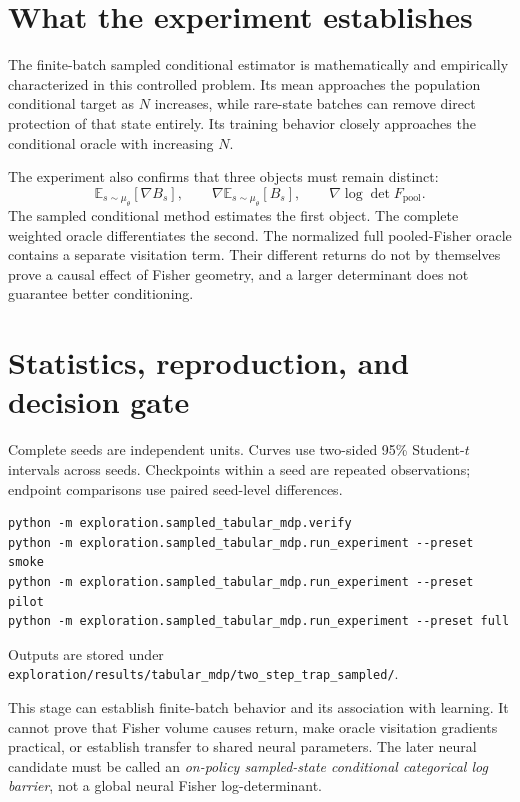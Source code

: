 \documentclass[10pt,a4paper]{article}
\begin{document}
\section{What the experiment establishes}
The finite-batch sampled conditional estimator is mathematically and
empirically characterized in this controlled problem. Its mean approaches the
population conditional target as $N$ increases, while rare-state batches can
remove direct protection of that state entirely. Its training behavior closely
approaches the conditional oracle with increasing $N$.

The experiment also confirms that three objects must remain distinct:
\begin{equation}
\mathbb E_{s\sim\mu_\theta}[\nabla B_s],\qquad
\nabla\mathbb E_{s\sim\mu_\theta}[B_s],\qquad
\nabla\log\det F_{\mathrm{pool}}.
\end{equation}
The sampled conditional method estimates the first object. The complete
weighted oracle differentiates the second. The normalized full pooled-Fisher
oracle contains a separate visitation term. Their different returns do not by
themselves prove a causal effect of Fisher geometry, and a larger determinant
does not guarantee better conditioning.

\section{Statistics, reproduction, and decision gate}
Complete seeds are independent units. Curves use two-sided 95\% Student-$t$
intervals across seeds. Checkpoints within a seed are repeated observations;
endpoint comparisons use paired seed-level differences.

\begin{verbatim}
python -m exploration.sampled_tabular_mdp.verify
python -m exploration.sampled_tabular_mdp.run_experiment --preset smoke
python -m exploration.sampled_tabular_mdp.run_experiment --preset pilot
python -m exploration.sampled_tabular_mdp.run_experiment --preset full
\end{verbatim}
Outputs are stored under
\texttt{exploration/results/tabular\_mdp/two\_step\_trap\_sampled/}.

This stage can establish finite-batch behavior and its association with
learning. It cannot prove that Fisher volume causes return, make oracle
visitation gradients practical, or establish transfer to shared neural
parameters. The later neural candidate must be called an \emph{on-policy
sampled-state conditional categorical log barrier}, not a global neural Fisher
log-determinant.
\end{document}
